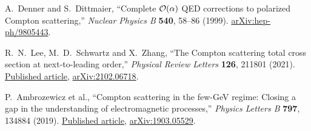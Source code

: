 A.~Denner and S.~Dittmaier,
``Complete $\mathcal{O}(\alpha)$ QED corrections to polarized Compton scattering,''
\textit{Nuclear Physics B} \textbf{540}, 58--86 (1999).
\href{https://arxiv.org/abs/hep-ph/9805443}{arXiv:hep-ph/9805443}.

R.~N.~Lee, M.~D.~Schwartz and X.~Zhang,
``The Compton scattering total cross section at next-to-leading order,''
\textit{Physical Review Letters} \textbf{126}, 211801 (2021).
\href{https://doi.org/10.1103/PhysRevLett.126.211801}{Published article},
\href{https://arxiv.org/abs/2102.06718}{arXiv:2102.06718}.

P.~Ambrozewicz et al.,
``Compton scattering in the few-GeV regime: Closing a gap in the understanding
of electromagnetic processes,''
\textit{Physics Letters B} \textbf{797}, 134884 (2019).
\href{https://doi.org/10.1016/j.physletb.2019.134884}{Published article},
\href{https://arxiv.org/abs/1903.05529}{arXiv:1903.05529}.
